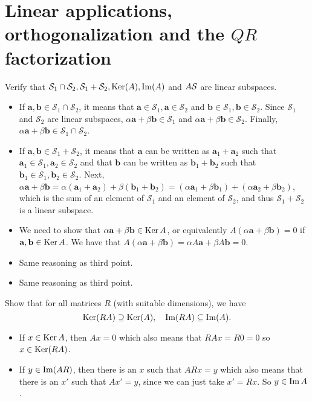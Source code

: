 \section{Linear applications, orthogonalization
and the \texorpdfstring{\(QR\)}{QR} factorization}

Verify that \(\mathcal{S}_1 \cap \mathcal{S}_2, \mathcal{S}_1 + \mathcal{S}_2, \operatorname{Ker}(A), \operatorname{Im}(A)\) and \(A\mathcal{S}\) are linear subspaces.
\begin{solution}
  \begin{itemize}
    \item If $\mathbf{a}, \mathbf{b} \in \mathcal{S}_1 \cap \mathcal{S}_2$,
      it means that $\mathbf{a} \in \mathcal{S}_1, \mathbf{a} \in \mathcal{S}_2$
      and $\mathbf{b} \in \mathcal{S}_1, \mathbf{b} \in \mathcal{S}_2$.
      Since $\mathcal{S}_1$ and $\mathcal{S}_2$
      are linear subspaces, $\alpha \mathbf{a} + \beta \mathbf{b} \in \mathcal{S}_1$
      and $\alpha \mathbf{a} + \beta \mathbf{b} \in \mathcal{S}_2$.
      Finally, $\alpha \mathbf{a} + \beta \mathbf{b} \in \mathcal{S}_1 \cap \mathcal{S}_2$.
    \item If $\mathbf{a},\mathbf{b} \in \mathcal{S}_1 + \mathcal{S}_2$,
       it means that $\mathbf{a}$ can be written as $\mathbf{a}_1 + \mathbf{a}_2$
       such that $\mathbf{a}_1 \in \mathcal{S}_1, \mathbf{a}_2 \in \mathcal{S}_2$
       and that $\mathbf{b}$ can be written as $\mathbf{b}_1 + \mathbf{b}_2$
       such that $\mathbf{b}_1 \in \mathcal{S}_1, \mathbf{b}_2 \in \mathcal{S}_2$.
       Next, $\alpha \mathbf{a} + \beta \mathbf{b} = \alpha (\mathbf{a}_1 + \mathbf{a}_2) + \beta (\mathbf{b}_1 + \mathbf{b}_2)
       =(\alpha \mathbf{a}_1 + \beta \mathbf{b}_1) + (\alpha \mathbf{a}_2 + \beta \mathbf{b}_2)$,
       which is the sum of an element of $\mathcal{S}_1$ and
       an element of $\mathcal{S}_2$, and thus $\mathcal{S}_1 + \mathcal{S}_2$
       is a linear subspace.
    \item We need to show that $\alpha \mathbf{a} + \beta \mathbf{b} \in \operatorname{Ker} A$,
      or equivalently $A(\alpha \mathbf{a} + \beta \mathbf{b}) = 0$
      if $\mathbf{a}, \mathbf{b} \in \operatorname{Ker} A$.
      We have that $A(\alpha \mathbf{a} + \beta \mathbf{b}) = \alpha A\mathbf{a} + \beta A\mathbf{b} = 0$.
    \item Same reasoning as third point.
    \item Same reasoning as third point.
  \end{itemize}
\end{solution}

Show that for all matrices \(R\) (with suitable dimensions), we have
\[
\operatorname{Ker}(RA) \supseteq \operatorname{Ker}(A), \quad \operatorname{Im}(RA) \subseteq \operatorname{Im}(A).
\]
\begin{solution}
  \begin{itemize}
    \item If $x \in \operatorname{Ker} A$, then $Ax = 0$
      which also means that $RAx = R0 = 0$ so $x \in \operatorname{Ker}(RA)$.
    \item If $y \in \operatorname{Im}(AR)$, then there is an $x$
      such that $ARx = y$
      which also means that there is an $x'$ such that
      $Ax' = y$, since we can just take $x' = Rx$.
      So $y \in \operatorname{Im} A$.
  \end{itemize}
\end{solution}

